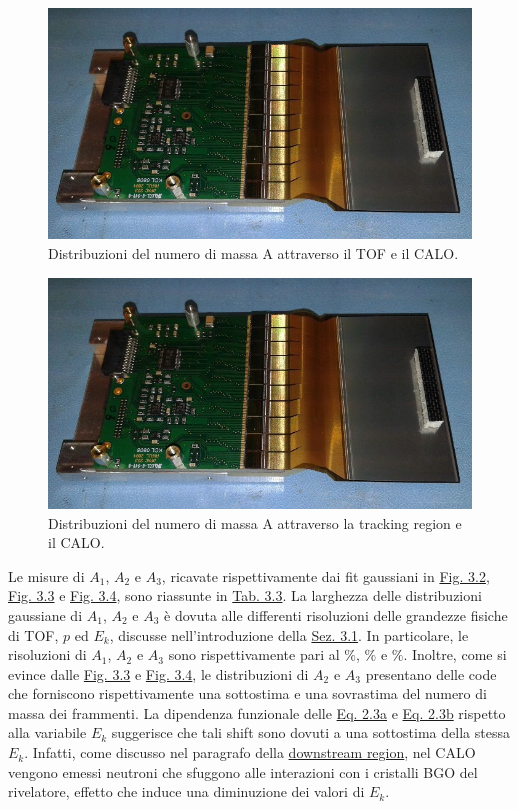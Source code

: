 \documentclass[12pt,a4paper,twoside]{report}
\begin{document}
	\begin{figure}[H]
		\centering
		\includegraphics[width=0.9\linewidth]{msd.jpg}
		\caption{Distribuzioni del numero di massa A attraverso il TOF e il CALO.}
		\label{fig:a2}
	\end{figure}
	\begin{figure}[H]
		\centering
		\includegraphics[width=0.9\linewidth]{msd.jpg}
		\caption{Distribuzioni del numero di massa A attraverso la tracking region e il CALO.}
		\label{fig:a3}
	\end{figure}
	Le misure di $A_1$, $A_2$ e $A_3$, ricavate rispettivamente dai fit gaussiani in \hyperref[fig:a1]{Fig. 3.2}, \hyperref[fig:a2]{Fig. 3.3} e \hyperref[fig:a3]{Fig. 3.4}, sono riassunte in \hyperref[tab:mass_numbers]{Tab. 3.3}. La larghezza delle distribuzioni gaussiane di $A_1$, $A_2$ e $A_3$ è dovuta alle differenti risoluzioni delle grandezze fisiche di TOF, $p$ ed $E_k$, discusse nell'introduzione della \hyperref[sec:fragment_identification]{Sez. 3.1}. In particolare, le risoluzioni di $A_1$, $A_2$ e $A_3$ sono rispettivamente pari al $\%$, $\%$ e $\%$. Inoltre, come si evince dalle \hyperref[fig:a2]{Fig. 3.3} e \hyperref[fig:a3]{Fig. 3.4}, le distribuzioni di $A_2$ e $A_3$ presentano delle code che forniscono rispettivamente una sottostima e una sovrastima del numero di massa dei frammenti. La dipendenza funzionale delle \hyperref[eq:a1]{Eq. 2.3a} e \hyperref[eq:a2]{Eq. 2.3b} rispetto alla variabile $E_k$ suggerisce che tali shift sono dovuti a una sottostima della stessa $E_k$. Infatti, come discusso nel paragrafo della \hyperref[par:downstream_region]{downstream region}, nel CALO vengono emessi neutroni che sfuggono alle interazioni con i cristalli BGO del rivelatore, effetto che induce una diminuzione dei valori di $E_k$.
\end{document}
